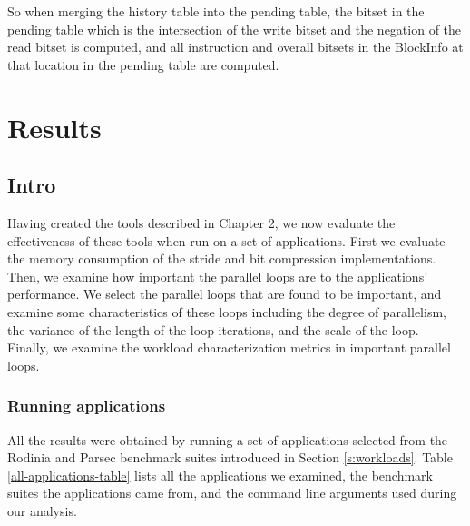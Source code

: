 \documentclass[12pt,twoside]{reedthesis}
\begin{document}
			
			So when merging the history table into the pending table, the bitset in the pending table which is the intersection of the write bitset and the negation of the read bitset is computed, and all instruction and overall bitsets in the BlockInfo at that location in the pending table are computed. 
			
\chapter{Results}
	
		\section{Intro}
	
		Having created the tools described in Chapter 2, we now evaluate the effectiveness of these tools when run on a set of applications. First we evaluate the memory consumption of the stride and bit compression implementations. Then, we examine how important the parallel loops are to the applications' performance. We select the parallel loops that are found to be important, and examine some characteristics of these loops including the degree of parallelism, the variance of the length of the loop iterations, and the scale of the loop. Finally, we examine the workload characterization metrics in important parallel loops. 
		
	
	
		\subsection{Running applications}
		
		All the results were obtained by running a set of applications selected from the Rodinia and Parsec benchmark suites introduced in Section \ref{s:workloads}.
		Table \ref{all-applications-table} lists all the applications we examined, the benchmark suites the applications came from, and the command line arguments used during our analysis. 
		
\end{document}
